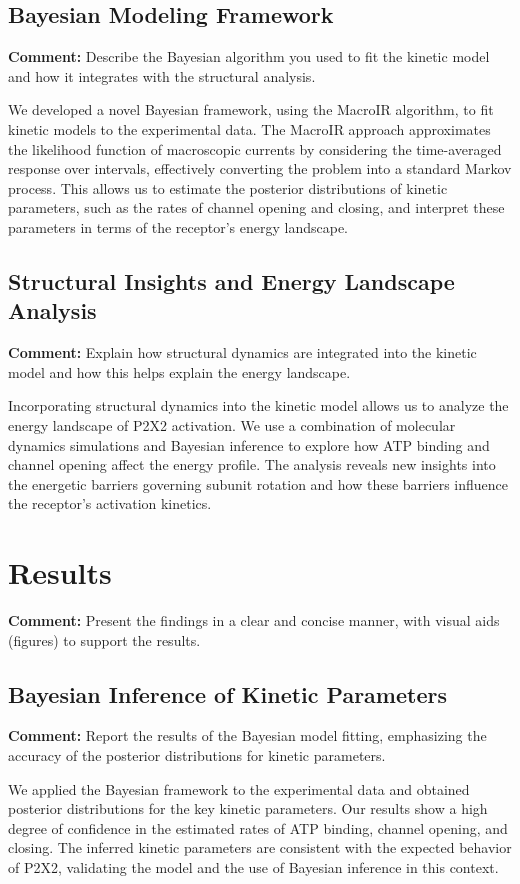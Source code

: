 \documentclass{article}
\begin{document}
	\subsection{Bayesian Modeling Framework}
	\textbf{Comment:} Describe the Bayesian algorithm you used to fit the kinetic model and how it integrates with the structural analysis.
	
	We developed a novel Bayesian framework, using the MacroIR algorithm, to fit kinetic models to the experimental data. The MacroIR approach approximates the likelihood function of macroscopic currents by considering the time-averaged response over intervals, effectively converting the problem into a standard Markov process. This allows us to estimate the posterior distributions of kinetic parameters, such as the rates of channel opening and closing, and interpret these parameters in terms of the receptor's energy landscape.
	
	\subsection{Structural Insights and Energy Landscape Analysis}
	\textbf{Comment:} Explain how structural dynamics are integrated into the kinetic model and how this helps explain the energy landscape.
	
	Incorporating structural dynamics into the kinetic model allows us to analyze the energy landscape of P2X2 activation. We use a combination of molecular dynamics simulations and Bayesian inference to explore how ATP binding and channel opening affect the energy profile. The analysis reveals new insights into the energetic barriers governing subunit rotation and how these barriers influence the receptor's activation kinetics.
	
	\section{Results}
	\textbf{Comment:} Present the findings in a clear and concise manner, with visual aids (figures) to support the results.
	
	\subsection{Bayesian Inference of Kinetic Parameters}
	\textbf{Comment:} Report the results of the Bayesian model fitting, emphasizing the accuracy of the posterior distributions for kinetic parameters.
	
	We applied the Bayesian framework to the experimental data and obtained posterior distributions for the key kinetic parameters. Our results show a high degree of confidence in the estimated rates of ATP binding, channel opening, and closing. The inferred kinetic parameters are consistent with the expected behavior of P2X2, validating the model and the use of Bayesian inference in this context.
	
\end{document}
